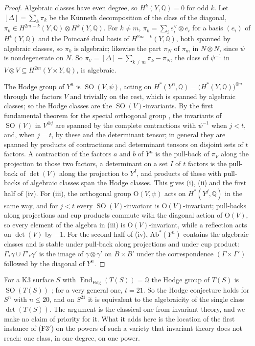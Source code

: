 \documentclass[11pt,reqno]{amsart}
\theoremstyle{plain}
\theoremstyle{definition}
\theoremstyle{remark}
\newcommand{\QQ}{\mathbb{Q}}
\DeclareMathOperator{\End}{End}
\DeclareMathOperator{\SO}{SO}
\begin{document}
\begin{proof}
Algebraic classes have even degree, so $H^{k}(Y,\QQ)=0$ for odd $k$. Let
$[\Delta]=\sum_{k}\pi_{k}$ be the K\"unneth decomposition of the class of the
diagonal, $\pi_{k}\in H^{2m-k}(Y,\QQ)\otimes H^{k}(Y,\QQ)$. For $k\ne m$,
$\pi_{k}=\sum_{i}e_{i}^{\vee}\otimes e_{i}$ for a basis $(e_{i})$ of
$H^{k}(Y,\QQ)$ and the Poincar\'e dual basis of $H^{2m-k}(Y,\QQ)$, both
spanned by algebraic classes, so $\pi_{k}$ is algebraic; likewise the part
$\pi_{N}$ of $\pi_{m}$ in $N\otimes N$, since $\psi$ is nondegenerate on $N$.
So $\pi_{V}=[\Delta]-\sum_{k\ne m}\pi_{k}-\pi_{N}$, the class of $\psi^{-1}$ in
$V\otimes V\subseteq H^{2m}(Y\times Y,\QQ)$, is algebraic.

The Hodge group of $Y^{n}$ is $\SO(V,\psi)$, acting on
$H^{*}(Y^{n},\QQ)=\bigl(H^{*}(Y,\QQ)\bigr)^{\otimes n}$ through the factors $V$
and trivially on the rest, which is spanned by algebraic classes; so the Hodge
classes are the $\SO(V)$-invariants. By the first fundamental theorem for the
special orthogonal group \cite[Chapter~5]{GW09}, the invariants of $\SO(V)$ in
$V^{\otimes j}$ are spanned by the complete contractions with $\psi^{-1}$ when
$j<t$, and, when $j=t$, by these and the determinant tensor; in general they
are spanned by products of contractions and determinant tensors on disjoint
sets of $t$ factors. A contraction of the factors $a$ and $b$ of $Y^{n}$ is the
pull-back of $\pi_{V}$ along the projection to those two factors, a
determinant on a set $I$ of $t$ factors is the pull-back of $\det(V)$ along
the projection to $Y^{I}$, and products of these with pull-backs of algebraic
classes span the Hodge classes. This gives (i), (ii) and the first half of
(iv). For (iii), the orthogonal group $\mathrm{O}(V,\psi)$ acts on
$H^{*}(Y^{j},\QQ)$ in the same way, and for $j<t$ every $\SO(V)$-invariant is
$\mathrm{O}(V)$-invariant; pull-backs along projections and cup products
commute with the diagonal action of $\mathrm{O}(V)$, so every element of the
algebra in (iii) is $\mathrm{O}(V)$-invariant, while a reflection acts on
$\det(V)$ by $-1$. For the second half of (iv), $\mathrm{Ab}^{*}(Y^{n})$
contains the algebraic classes and is stable under pull-back along projections
and under cup product: $\Gamma_{*}\gamma\cup\Gamma'_{*}\gamma'$ is the image of
$\gamma\otimes\gamma'$ on $B\times B'$ under the correspondence
$(\Gamma\times\Gamma')$ followed by the diagonal of $Y^{n}$.
\end{proof}

For a K3 surface $S$ with $\End_{\mathrm{Hdg}}(T(S))=\QQ$ the Hodge group of
$T(S)$ is $\SO(T(S))$ \cite{Zar83}; for a very general one, $t=21$. So the
Hodge conjecture holds for $S^{n}$ with $n\le20$, and on $S^{21}$ it is
equivalent to the algebraicity of the single class $\det(T(S))$. The argument
is the classical one from invariant theory, and we make no claim of priority
for it. What it adds here is the location of the first instance of
\textup{(F3$'$)} on the powers of such a variety that invariant theory does
not reach: one class, in one degree, on one power.
\end{document}
